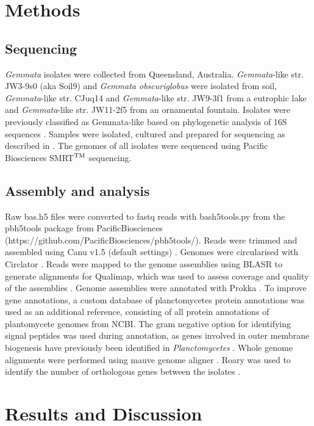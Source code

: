 \section{Methods}

\subsection{Sequencing}
\textit{Gemmata} isolates were collected from Queensland, Australia. \textit{Gemmata}-like str. JW3-9s0 (aka Soil9) and \textit{Gemmata obscuriglobus} were isolated from soil, \textit{Gemmata}-like str. CJuq14 and \textit{Gemmata}-like str. JW9-3f1 from a eutrophic lake and \textit{Gemmata}-like str. JW11-2f5 from an ornamental fountain. Isolates were previously classified as Gemmata-like based on phylogenetic analysis of 16S sequences \citep{Wang2002-qh}. Samples were isolated, cultured and prepared for sequencing as described in \citep{Wang2002-qh}. The genomes of all isolates were sequenced using Pacific Biosciences SMRT$\textsuperscript{TM}$ sequencing. 

\subsection{Assembly and analysis}

Raw bas.h5 files were converted to fastq reads with bash5tools.py from the pbh5tools package from PacificBiosciences (https://github.com/PacificBiosciences/pbh5tools/). Reads were trimmed and assembled using Canu v1.5 (default settings) \citep{Koren2017-fv}. Genomes were circularised with Circlator \citep{Hunt2015-tj}. Reads were mapped to the genome assemblies using BLASR \citep{Chaisson2012-sx} to generate alignments for Qualimap, which was used to assess coverage and quality of the assemblies \citep{Okonechnikov2016-ly}. Genome assemblies were annotated with Prokka \citep{Seemann2014-sxxa}. To improve gene annotations, a custom database of planctomycetes protein annotations was used as an additional reference, consisting of all protein annotations of plantomycete genomes from NCBI. The gram negative option for identifying signal peptides was used during annotation, as genes involved in outer membrane biogenesis have previously been identified in \textit{Planctomycetes} \citep{Speth2012-of}. Whole genome alignments were performed using mauve genome aligner \citep{Darling2010-vl}. Roary was used to identify the number of orthologous genes between the isolates \citep{Page2015-lu}. 

\section{Results and Discussion}

